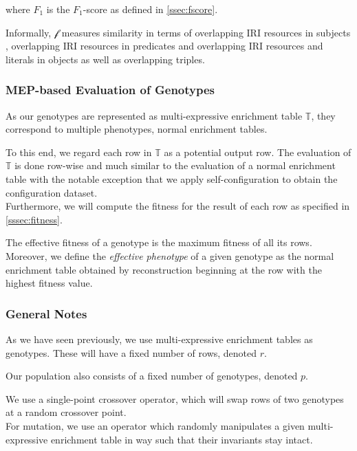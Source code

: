 where $F_1$ is the $F_1$-score as defined in \autoref{ssec:fscore}.

Informally, $\mathcal{f}$ measures similarity in terms of overlapping \ac{IRI} resources in subjects , overlapping \ac{IRI} resources in predicates and overlapping \ac{IRI} resources and literals in objects as well as overlapping triples.

\subsubsection{MEP-based Evaluation of Genotypes}
\label{sssec:mepgeno}
As our genotypes are represented as multi-expressive enrichment table $\mathbb{T}$, they correspond to multiple phenotypes, \ie normal enrichment tables.

To this end, we regard each row in $\mathbb{T}$ as a potential output row.
The evaluation of $\mathbb{T}$ is done row-wise and much similar to the evaluation of a normal enrichment table with the notable exception that we apply self-configuration to obtain the configuration dataset.\\

Furthermore, we will compute the fitness for the result of each row  as specified in \autoref{sssec:fitness}.

The effective fitness of a genotype is the maximum fitness of all its rows.
Moreover, we define the \emph{effective phenotype} of a given genotype as the normal enrichment table obtained by reconstruction beginning at the row with the highest fitness value.

\subsubsection{General Notes}
\label{sssec:geneticoperators}

As we have seen previously, we use multi-expressive enrichment tables as genotypes.
These will have a fixed number of rows, denoted $r$.

Our population also consists of a fixed number of genotypes, denoted $p$.

We use a single-point crossover operator, which will swap rows of two genotypes at a random crossover point.\\

For mutation, we use an operator which randomly manipulates a given multi-expressive enrichment table in way such that their invariants stay intact.\\

